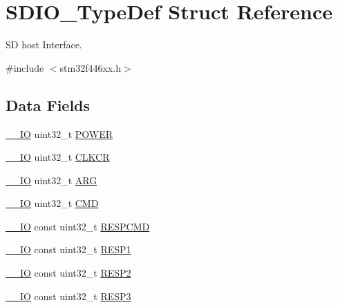 \hypertarget{struct_s_d_i_o___type_def}{}\section{S\+D\+I\+O\+\_\+\+Type\+Def Struct Reference}
\label{struct_s_d_i_o___type_def}


SD host Interface.  




{\ttfamily \#include $<$stm32f446xx.\+h$>$}

\subsection*{Data Fields}
\begin{DoxyCompactItemize}
\item 
\mbox{\hyperlink{core__sc300_8h_aec43007d9998a0a0e01faede4133d6be}{\+\_\+\+\_\+\+IO}} uint32\+\_\+t \mbox{\hyperlink{struct_s_d_i_o___type_def_a65bff76f3af24c37708a1006d54720c7}{P\+O\+W\+ER}}
\item 
\mbox{\hyperlink{core__sc300_8h_aec43007d9998a0a0e01faede4133d6be}{\+\_\+\+\_\+\+IO}} uint32\+\_\+t \mbox{\hyperlink{struct_s_d_i_o___type_def_aa94197378e20fc739d269be49d9c5d40}{C\+L\+K\+CR}}
\item 
\mbox{\hyperlink{core__sc300_8h_aec43007d9998a0a0e01faede4133d6be}{\+\_\+\+\_\+\+IO}} uint32\+\_\+t \mbox{\hyperlink{struct_s_d_i_o___type_def_a07d4e63efcbde252c667e64a8d818aa9}{A\+RG}}
\item 
\mbox{\hyperlink{core__sc300_8h_aec43007d9998a0a0e01faede4133d6be}{\+\_\+\+\_\+\+IO}} uint32\+\_\+t \mbox{\hyperlink{struct_s_d_i_o___type_def_adcf812cbe5147d300507d59d4a55935d}{C\+MD}}
\item 
\mbox{\hyperlink{core__sc300_8h_aec43007d9998a0a0e01faede4133d6be}{\+\_\+\+\_\+\+IO}} const uint32\+\_\+t \mbox{\hyperlink{struct_s_d_i_o___type_def_a195d1a8a6ae4f6072f4e4b62298051fe}{R\+E\+S\+P\+C\+MD}}
\item 
\mbox{\hyperlink{core__sc300_8h_aec43007d9998a0a0e01faede4133d6be}{\+\_\+\+\_\+\+IO}} const uint32\+\_\+t \mbox{\hyperlink{struct_s_d_i_o___type_def_a7da778413f6db1f83ae25caed03382d4}{R\+E\+S\+P1}}
\item 
\mbox{\hyperlink{core__sc300_8h_aec43007d9998a0a0e01faede4133d6be}{\+\_\+\+\_\+\+IO}} const uint32\+\_\+t \mbox{\hyperlink{struct_s_d_i_o___type_def_a44614d7422faffd14af83884e76b2d3e}{R\+E\+S\+P2}}
\item 
\mbox{\hyperlink{core__sc300_8h_aec43007d9998a0a0e01faede4133d6be}{\+\_\+\+\_\+\+IO}} const uint32\+\_\+t \mbox{\hyperlink{struct_s_d_i_o___type_def_a270ee3c6e9f87e5851422ae0ef255fd4}{R\+E\+S\+P3}}

\end{DoxyCompactItemize}
